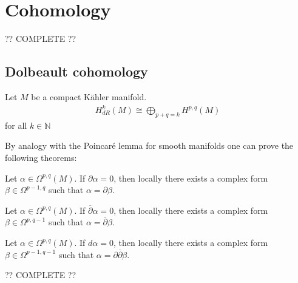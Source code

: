 \section{Cohomology}
%

    ?? COMPLETE ??

\subsection{Dolbeault cohomology}

    \begin{theorem}
        Let $M$ be a compact K\"ahler manifold.
        \begin{gather}
            H^k_{dR}(M)\cong\bigoplus_{p+q=k}H^{p,q}(M)
        \end{gather}
        for all $k\in\mathbb{N}$
    \end{theorem}

    By analogy with the Poincar\'e lemma for smooth manifolds one can prove the following theorems:
    \begin{theorem}
        Let $\alpha\in\Omega^{p,q}(M)$. If $\partial\alpha = 0$, then locally there exists a complex form $\beta\in\Omega^{p-1,q}$ such that $\alpha = \partial\beta$.
    \end{theorem}
    \begin{theorem}
        Let $\alpha\in\Omega^{p,q}(M)$. If $\overline{\partial}\alpha = 0$, then locally there exists a complex form $\beta\in\Omega^{p,q-1}$ such that $\alpha = \overline{\partial}\beta$.
    \end{theorem}
    \begin{theorem}\label{complex:del_delbar_lemma}
        Let $\alpha\in\Omega^{p,q}(M)$. If $d\alpha = 0$, then locally there exists a complex form $\beta\in\Omega^{p-1,q-1}$ such that $\alpha = \partial\overline{\partial}\beta$.
    \end{theorem}

    ?? COMPLETE ??